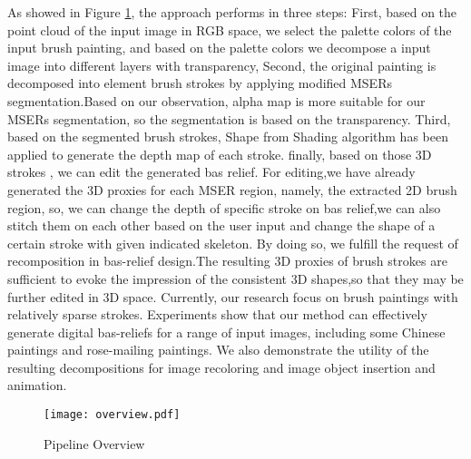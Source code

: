 As showed in Figure \ref{pip}, the approach performs in three steps: First,  based on the point cloud of the input image in RGB space, we select the palette colors of the input brush painting, and based on the palette colors we decompose a input image into different layers with transparency,  Second,  the original painting is decomposed into element brush strokes by applying modified MSERs segmentation.Based on our observation, alpha map is more suitable for our MSERs segmentation, so the segmentation is based on the transparency. Third, based on the segmented brush strokes,  Shape from Shading algorithm has been applied to generate the depth map of each stroke.  finally, based on those 3D strokes , we can edit the generated bas relief. For editing,we have already generated the 3D proxies for each MSER region, namely, the extracted 2D brush region, so, we can change the depth of specific stroke on bas relief,we can also stitch them on each other based on the user input and change the shape of a certain stroke with given indicated skeleton. By doing so, we fulfill the request of recomposition in bas-relief design.The resulting 3D proxies of brush strokes are sufficient to evoke the impression of the consistent 3D shapes,so that they may be further edited in 3D space. 
Currently, our research focus on brush paintings with relatively sparse strokes.
Experiments show that our method can effectively generate digital bas-reliefs for a range of input images, including some Chinese paintings and rose-mailing paintings.
We also demonstrate the utility of the resulting decompositions for image recoloring and image object insertion and animation.

\begin{figure}[H]
\centering
\texttt{[image: overview.pdf]}
\caption{Pipeline Overview}
\label{pip}
\end{figure} 
 
\newpage


 

